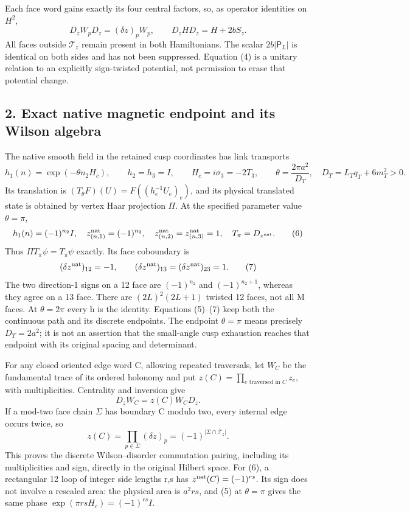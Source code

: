 \documentclass[
  11pt,
]{article}
\begin{document}
Each face word gains exactly its four central factors, so, as operator
identities on \(H^2\), \[
 D_zW_pD_z=(\delta z)_pW_p,\qquad
 \boxed{D_zHD_z=H+2bS_z.}
\tag{4}
\] All faces outside \(\mathcal T_z\) remain present in both
Hamiltonians. The scalar \(2b|\mathsf P_L|\) is identical on both sides
and has not been suppressed. Equation (4) is a unitary relation to an
explicitly sign-twisted potential, not permission to erase that
potential change.

\subsection{2. Exact native magnetic endpoint and its Wilson
algebra}\label{magnetic-part-7-exact-native-magnetic-endpoint-and-its-wilson-algebra}

The native smooth field in the retained cusp coordinates has link
transports \[
 h_1(n)=\exp(-\theta n_2H_c),\qquad h_2=h_3=I,
 \qquad H_c=i\sigma_3=-2T_3,\qquad
 \theta=\frac{2\pi a^2}{D_T},\quad
 D_T=L_Tq_T+6m_T^2>0.
\tag{5}
\] Its translation is \((T_\theta F)(U)=F((h_e^{-1}U_e)_e)\), and its
physical translated state is obtained by vertex Haar projection \(\Pi\).
At the specified parameter value \(\theta=\pi\), \[
 h_1(n)=(-1)^{n_2}I,
 \quad z^{\rm nat}_{(n,1)}=(-1)^{n_2},
 \quad z^{\rm nat}_{(n,2)}=z^{\rm nat}_{(n,3)}=1,
 \quad T_\pi=D_{z^{\rm nat}}.
\tag{6}
\] Thus \(\Pi T_\pi\psi=T_\pi\psi\) exactly. Its face coboundary is \[
 (\delta z^{\rm nat})_{12}=-1,\qquad
 (\delta z^{\rm nat})_{13}=(\delta z^{\rm nat})_{23}=1.
\tag{7}
\] The two direction-1 signs on a 12 face are \((-1)^{n_2}\) and
\((-1)^{n_2+1}\), whereas they agree on a 13 face. There are
\((2L)^2(2L+1)\) twisted 12 faces, not all M faces. At \(\theta=2\pi\)
every h is the identity. Equations (5)--(7) keep both the continuous
path and its discrete endpoints. The endpoint \(\theta=\pi\) means
precisely \(D_T=2a^2\); it is not an assertion that the small-angle cusp
exhaustion reaches that endpoint with its original spacing and
determinant.

For any closed oriented edge word C, allowing repeated traversals, let
\(W_C\) be the fundamental trace of its ordered holonomy and put
\(z(C)=\prod_{e\text{ traversed in }C}z_e\), with multiplicities.
Centrality and inversion give \[
 \boxed{D_zW_C=z(C)W_CD_z.}
\tag{8}
\] If a mod-two face chain \(\Sigma\) has boundary C modulo two, every
internal edge occurs twice, so \[
 z(C)=\prod_{p\in\Sigma}(\delta z)_p
     =(-1)^{|\Sigma\cap\mathcal T_z|}.
\tag{9}
\] This proves the discrete Wilson--disorder commutation pairing,
including its multiplicities and sign, directly in the original Hilbert
space. For (6), a rectangular 12 loop of integer side lengths r,s has
\(z^{\rm nat}(C)=(-1)^{rs}\). Its sign does not involve a rescaled area:
the physical area is \(a^2rs\), and (5) at \(\theta=\pi\) gives the same
phase \(\exp(\pi rsH_c)=(-1)^{rs}I\).
\end{document}
